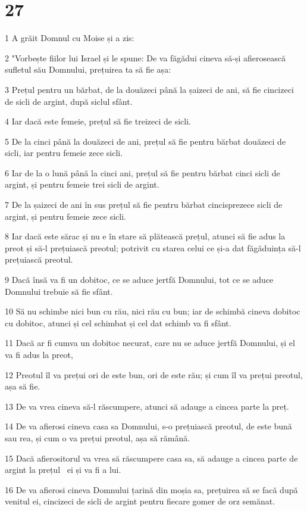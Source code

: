 \chapter{27}

\par 1 A grăit Domnul cu Moise și a zis:
\par 2 "Vorbește fiilor lui Israel și le spune: De va făgădui cineva să-și afierosească sufletul său Domnului, prețuirea ta să fie așa:
\par 3 Prețul pentru un bărbat, de la douăzeci până la șaizeci de ani, să fie cincizeci de sicli de argint, după siclul sfânt.
\par 4 Iar dacă este femeie, prețul să fie treizeci de sicli.
\par 5 De la cinci până la douăzeci de ani, prețul să fie pentru bărbat douăzeci de sicli, iar pentru femeie zece sicli.
\par 6 Iar de la o lună până la cinci ani, prețul să fie pentru bărbat cinci sicli de argint, și pentru femeie trei sicli de argint.
\par 7 De la șaizeci de ani în sus prețul să fie pentru bărbat cincisprezece sicli de argint, și pentru femeie zece sicli.
\par 8 Iar dacă este sărac și nu e în stare să plătească prețul, atunci să fie adus la preot și să-l prețuiască preotul; potrivit cu starea celui ce și-a dat făgăduința să-l prețuiască preotul.
\par 9 Dacă însă va fi un dobitoc, ce se aduce jertfă Domnului, tot ce se aduce Domnului trebuie să fie sfânt.
\par 10 Să nu schimbe nici bun cu rău, nici rău cu bun; iar de schimbă cineva dobitoc cu dobitoc, atunci și cel schimbat și cel dat schimb va fi sfânt.
\par 11 Dacă ar fi cumva un dobitoc necurat, care nu se aduce jertfă Domnului, și el va fi adus la preot,
\par 12 Preotul îl va prețui ori de este bun, ori de este rău; și cum îl va prețui preotul, așa să fie.
\par 13 De va vrea cineva să-l răscumpere, atunci să adauge a cincea parte la preț.
\par 14 De va afierosi cineva casa sa Domnului, s-o prețuiască preotul, de este bună sau rea, și cum o va prețui preotul, așa să rămână.
\par 15 Dacă afierositorul va vrea să răscumpere casa sa, să adauge a cincea parte de argint la prețul  ei și va fi a lui.
\par 16 De va afierosi cineva Domnului țarină din moșia sa, prețuirea să se facă după venitul ei, cincizeci de sicli de argint pentru fiecare gomer de orz semănat.
